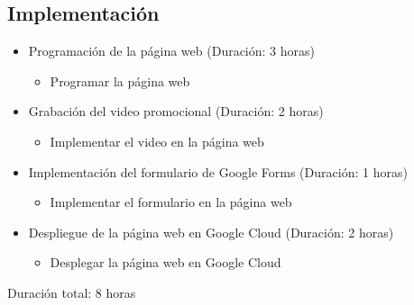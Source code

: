 \documentclass{report}
\begin{document}
            \subsection{Implementación}
                \begin{itemize}
                    \item Programación de la página web (Duración: 3 horas)
                    \begin{itemize}
                        \item Programar la página web
                    \end{itemize}
                    \item Grabación del video promocional (Duración: 2 horas)
                    \begin{itemize}
                        \item Implementar el video en la página web
                    \end{itemize}
                    \item Implementación del formulario de Google Forms (Duración: 1 horas)
                    \begin{itemize}
                        \item Implementar el formulario en la página web
                    \end{itemize}
                    \item Despliegue de la página web en Google Cloud (Duración: 2 horas)
                    \begin{itemize}
                        \item Desplegar la página web en Google Cloud
                    \end{itemize}
                \end{itemize}
                Duración total: 8 horas
\end{document}
